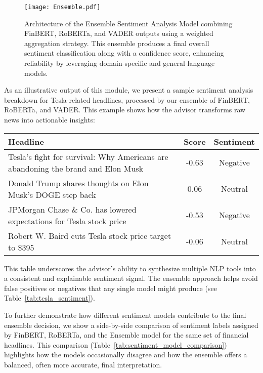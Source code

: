 \documentclass[conference]{IEEEtran}
\begin{document}
\begin{figure}[htbp]
\centering
\texttt{[image: Ensemble.pdf]}
\caption{Architecture of the Ensemble Sentiment Analysis Model combining FinBERT, RoBERTa, and VADER outputs using a weighted aggregation strategy. This ensemble produces a final overall sentiment classification along with a confidence score, enhancing reliability by leveraging domain-specific and general language models.}
\label{fig:ensemble_architecture}
\end{figure}

As an illustrative output of this module, we present a sample sentiment analysis breakdown for Tesla-related headlines, processed by our ensemble of FinBERT, RoBERTa, and VADER. This example shows how the advisor transforms raw news into actionable insights:

\begin{table*}[htbp]
\renewcommand{\arraystretch}{1.3} %
\centering
\caption{Example Sentiment Analysis Output: Tesla News Headlines Evaluated by the Ensemble Model.}
\label{tab:tesla_sentiment}
\begin{tabular}{|p{10cm}|c|c|}
\hline
\textbf{Headline} & \textbf{Score} & \textbf{Sentiment} \\
\hline
Tesla's fight for survival: Why Americans are abandoning the brand and Elon Musk & -0.63 & Negative \\
\hline
Donald Trump shares thoughts on Elon Musk's DOGE step back & 0.06 & Neutral \\
\hline
JPMorgan Chase \& Co. has lowered expectations for Tesla stock price & -0.53 & Negative \\
\hline
Robert W. Baird cuts Tesla stock price target to \$395 & -0.06 & Neutral \\
\hline
\end{tabular}
\end{table*}

This table underscores the advisor’s ability to synthesize multiple NLP tools into a consistent and explainable sentiment signal. The ensemble approach helps avoid false positives or negatives that any single model might produce (see Table~\ref{tab:tesla_sentiment}).

To further demonstrate how different sentiment models contribute to the final ensemble decision, we show a side-by-side comparison of sentiment labels assigned by FinBERT, RoBERTa, and the Ensemble model for the same set of financial headlines. This comparison (Table~\ref{tab:sentiment_model_comparison}) highlights how the models occasionally disagree and how the ensemble offers a balanced, often more accurate, final interpretation.
\end{document}
